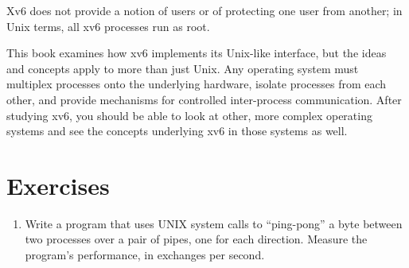 Xv6 does not provide a notion of users or of protecting
one user from another; in Unix terms, all xv6 processes
run as root.

This book examines how xv6 implements its Unix-like interface,
but the ideas and concepts apply to more than just Unix.
Any operating system must multiplex processes onto
the underlying hardware, isolate processes from each
other, and provide mechanisms for controlled
inter-process communication.
After studying xv6, you should be able to
look at other, more complex operating systems
and see the concepts underlying xv6 in those systems as well.

\section{Exercises}

\begin{enumerate}

\item Write a program that uses UNIX system calls to
``ping-pong'' a byte between two processes over a pair
of pipes, one for each direction. Measure the
program's performance, in exchanges per second.

\end{enumerate}
